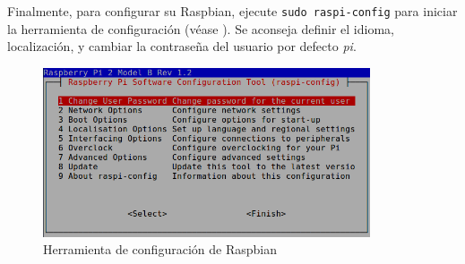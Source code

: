 \documentclass[letterpaper,10.5pt]{article}
\begin{document}
Finalmente, para configurar su Raspbian, ejecute \texttt{sudo raspi-config}  para iniciar la herramienta de configuración (véase ).
Se aconseja definir el idioma, localización, y cambiar la contraseña del usuario por defecto \textit{pi}.

\begin{figure}[H]
	\centering%
	\includegraphics[width=0.8\linewidth,height=5cm,keepaspectratio]{img/p01-appendix02.png} %
	\caption{Herramienta de configuración de Raspbian}
	\label{fig:raspberry-config-tool} %
\end{figure}
\end{document}
